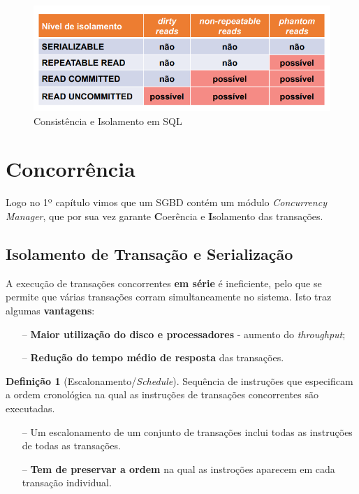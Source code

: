 \documentclass[oneside]{book}
\theoremstyle{definition}
\newtheorem{definition}{Definição}
\begin{document}
\begin{figure}[H]
    \centering
    \includegraphics[scale = 0.4]{cap_transct/isolamento_transacoes.png}
    \caption{Consistência e Isolamento em SQL}
\end{figure}

\section{Concorrência}
Logo no 1º capítulo vimos que um SGBD contém um módulo \textit{Concurrency Manager}, que por sua vez garante \textbf{C}oerência e \textbf{I}solamento das transações.

\subsection{Isolamento de Transação e Serialização}
A execução de transações concorrentes \textbf{em série} é ineficiente, pelo que se permite que várias transações corram simultaneamente no sistema. Isto traz algumas \textbf{vantagens}:
\begin{itemize}
    \itemsep 0cm
    \item[--] \textbf{Maior utilização do disco e processadores} - aumento do \textit{throughput};
    \item[--] \textbf{Redução do tempo médio de resposta} das transações.
\end{itemize}

\begin{definition}[Escalonamento/\textit{Schedule}]
    Sequência de instruções que especificam a ordem cronológica na qual as instruções de transações concorrentes são executadas.
    \begin{itemize}
        \itemsep 0cm
        \item[--] Um escalonamento de um conjunto de transações inclui todas as instruções de todas as transações.
        \item[--] \textbf{Tem de preservar a ordem} na qual as instroções aparecem em cada transação individual.
    \end{itemize}
\end{definition}
\end{document}
